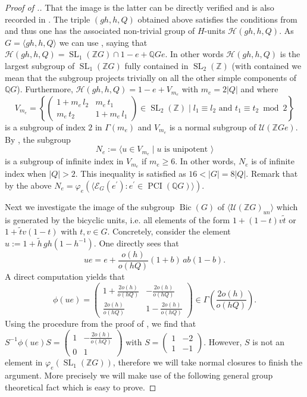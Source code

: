 \documentclass[a4paper,10pt]{amsart}
\theoremstyle{definition}
\theoremstyle{remark}
\newcommand{\SL}{\operatorname{SL}}
\newcommand\PCI{\operatorname{PCI}}
\newcommand{\U}{{\mathcal U}}
\newcommand\wt{\widetilde}
\newcommand{\Z}{{\mathbb Z}}
\newcommand{\Q}{{\mathbb Q}}
\newcommand\Bic{\operatorname{Bic}}
\begin{document}
\begin{proof}[Proof of .]
That the image is the latter can be directly verified and is also recorded in \cite[Proposition 8.1]{JJS}. The triple $(gh,h,Q)$ obtained above satisfies the conditions from \cite[Definition 10.5 \& Theorem 10.6]{JJS} and thus one has the associated non-trivial group of $H$-units $\mathcal{H}(gh,h,Q)$. As $G = \langle gh, h, Q \rangle$ we can use \cite[Theorem 10.8]{JJS}, saying that $\mathcal{H}(gh,h,Q) = \SL_1(\Z G) \cap 1-e + \Q Ge.$ In other words $\mathcal{H}(gh,h,Q)$ is the largest subgroup of $\SL_1(\Z G)$ fully contained in $\SL_{2}(\Z)$ (with contained we mean that the subgroup projects trivially on all the other simple components of $\Q G$). Furthermore, $\mathcal{H}(gh,h,Q) = 1 - e + V_{m_e}$ with $m_e = 2 |Q|$ and where 
$$V_{m_e} = \left\{ \left(\begin{array}{cc}
1 + m_e \, l_2 & m_e \, t_1  \\
 m_e \,t_2 & 1 + m_e\, l_1
\end{array} \right) \in \SL_2(\Z) \mid l_1 \equiv l_2 \text{ and } t_1 \equiv t_2 \bmod 2 \right\}$$
 is a subgroup of index $2$ in $\Gamma(m_e)$ and $V_{m_e}$ is a normal subgroup of $\U (\Z G e)$. By , the subgroup 
\begin{equation}\label{unipotent in the H-unit sbgrp}
N_e := \langle u \in V_{m_e} \mid u \text{ is unipotent } \rangle
\end{equation}
 is a subgroup of infinite index in $V_{m_e}$ if $m_e \geq 6$. In other words, $N_e$ is of infinite index when $|Q| > 2$. This inequality is satisfied as $16 < |G| = 8 |Q|$. Remark that by the above $N_e = \varphi_e(\langle \mathcal{E}_G(e^{\prime}) : e^{\prime} \in \PCI(\Q G) \rangle)$.

Next we investigate the image of the subgroup $\Bic(G)$ of $\langle  \U(\Z G)_{un} \rangle$ which is generated by the bicyclic units, i.e. all elements of the form $1 + (1-t) v \wt{t}$ or $1 + \wt{t} v (1-t)$ with $t,v \in G$. Concretely, consider the element $u := 1 + \wt{h} \, gh (1- h^{-1}).$ 
One directly sees that 
$$ue  = e + \frac{o(h)}{o(hQ)} (1 + b) \, ab (1- b).$$
A direct computation yields that
$$\phi(ue) = \begin{pmatrix}
1+ \frac{2o(h)}{o(hQ)}  & -\frac{2o(h)}{o(hQ)} \\
\frac{2o(h)}{o(hQ)} & 1 -\frac{2o(h)}{o(hQ)}
\end{pmatrix} \in \Gamma\left(\frac{2o(h)}{o(hQ)}\right).$$
Using the procedure from the proof of , we find that $S^{-1} \phi(ue) S = \begin{pmatrix}
1 & -\frac{2o(h)}{o(hQ)} \\ 0 & 1
\end{pmatrix}$ with $S = \begin{pmatrix}
1 & -2 \\ 1 & -1
\end{pmatrix}.$ However, $S$ is not an element in $\varphi_e(\SL_1(\Z G))$, therefore we will take normal closures to finish the argument. More precisely we will make use of the following general group theoretical fact which is easy to prove.


\end{proof}
\end{document}
